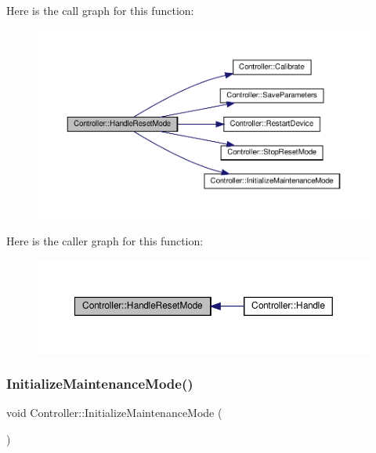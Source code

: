 Here is the call graph for this function\+:
\nopagebreak
\begin{figure}[H]
\begin{center}
\leavevmode
\includegraphics[width=350pt]{classController_ae512c48c1ebafb35c90948835361cf0c_cgraph}
\end{center}
\end{figure}
Here is the caller graph for this function\+:
\nopagebreak
\begin{figure}[H]
\begin{center}
\leavevmode
\includegraphics[width=350pt]{classController_ae512c48c1ebafb35c90948835361cf0c_icgraph}
\end{center}
\end{figure}
\mbox{\label{classController_ae727ee9be8a2b2d0a966d1c14f85f360}} 
\subsubsection{\texorpdfstring{Initialize\+Maintenance\+Mode()}{InitializeMaintenanceMode()}}
{\footnotesize\ttfamily void Controller\+::\+Initialize\+Maintenance\+Mode (\begin{DoxyParamCaption}{ }\end{DoxyParamCaption})\hspace{0.3cm}{\ttfamily [private]}}




